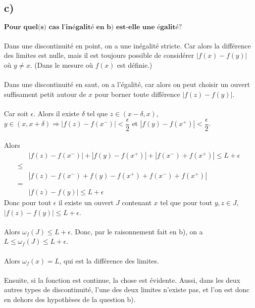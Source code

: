 \documentclass[a4paper,10pt]{article}
\begin{document}
\subsection*{c)}
$\textbf{Pour quel(s) cas l'inégalité en b) est-elle une égalité?}$
\\
\\
Dans une discontinuité en point, on a une inégalité stricte. Car alors la différence des limites est nulle, 
mais il est toujours possible de considérer $|f(x) - f(y)|$ où $y \not = x$. (Dans le mesure où $f(x)$ est définie.)
\\
\\
Dans une discontinuité en saut, on a l'égalité, car alors on peut choisir un ouvert suffisament petit autour de
$x$ pour borner toute différence $|f(z) - f(y)|$. 
\\
\\
Car soit $\epsilon$. Alors il existe $\delta$ tel que $z \in (x - \delta, x)$,
$y \in (x, x + \delta) \Rightarrow |f(z) - f(x^-)| < \dfrac{\epsilon}{2}$ et $|f(y) - f(x^+)| < \dfrac{\epsilon}{2}$.
\\
\\
Alors
\begin{align*}
 & |f(z) - f(x^-)| + |f(y) - f(x^+)| + |f(x^-) + f(x^+)| \leq L + \epsilon \\
 \leq \\
 & |f(z) - f(x^-) + f(y) - f(x^+) + f(x^-) + f(x^+)| \\
 = \\
 & |f(z) - f(y)| \leq L + \epsilon
\end{align*}
Donc pour tout $\epsilon$ il existe un ouvert $J$ contenant $x$ tel que pour tout $y,z \in J$, $|f(z) - f(y)| \leq L + \epsilon$. 
\\
\\
Alors $\omega_f (J) \leq L + \epsilon$. Donc, par le raisonnement fait en b), on a $L \leq \omega_f (J) \leq L + \epsilon$. 
\\
\\
Alors $\omega_f (x) = L$, qui est la différence des limites.
\\
\\
Ensuite, si la fonction est continue, la chose est évidente. Aussi, dans les deux autres types de discontinuité, l'une des deux limites
n'existe pas, et l'on est donc en dehors des hypothèses de la question b).
\end{document}
